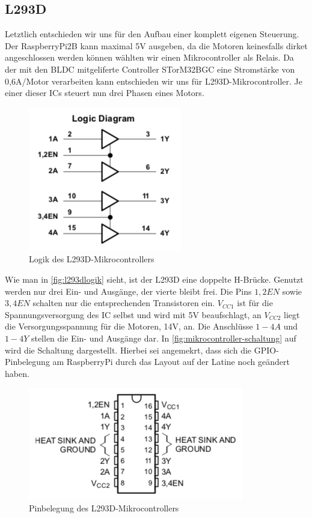 \documentclass[12pt,a4paper,bibliography=totocnumbered,listof=totocnumbered]{scrartcl}
\begin{document}
\subsection{L293D}
Letztlich entschieden wir uns für den Aufbau einer komplett eigenen Steuerung. Der RaspberryPi2B kann maximal 5V ausgeben, da die Motoren keinesfalls dirket angeschlossen werden können wählten wir einen Mikrocontroller als Relais. Da der mit den BLDC mitgeliferte Controller STorM32BGC eine Stromstärke von 0,6A/Motor verarbeiten kann entschieden wir uns für L293D-Mikrocontroller. Je einer dieser ICs steuert nun drei Phasen eines Motors.
\begin{figure}[th]
	\centering
	\includegraphics[width=0.4\linewidth]{l293d_logik}
	\caption{Logik des L293D-Mikrocontrollers \cite{l293d}}
	\label{fig:l293dlogik}
\end{figure}

Wie man in \autoref{fig:l293dlogik} sieht, ist der L293D eine doppelte H-Brücke. Genutzt werden nur drei Ein- und Ausgänge, der vierte bleibt frei. Die Pins $1,2EN$ sowie $3,4EN$ schalten nur die entsprechenden Transistoren ein. $V_{CC1}$ ist für die Spannungsversorgung des IC selbst und wird mit 5V beaufschlagt, an $V_{CC2}$ liegt die Versorgungsspannung für die Motoren, 14V, an. Die Anschlüsse $1-4A$ und $1-4Y$ stellen die Ein- und Ausgänge dar. In \autoref{fig:mikrocontroller-schaltung} auf  wird die Schaltung dargestellt. Hierbei sei angemekrt, dass sich die GPIO-Pinbelegung am RaspberryPi durch das Layout auf der Latine noch geändert haben.
\begin{figure}[th]
	\centering
	\includegraphics[width=0.6\linewidth]{l293d_pins}
	\caption{Pinbelegung des L293D-Mikrocontrollers \cite{l293d}}
	\label{fig:l293dpins}
\end{figure}
\end{document}
